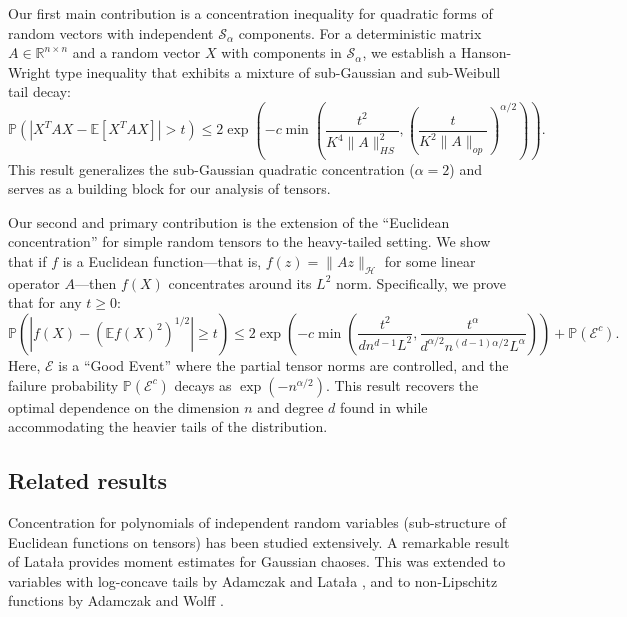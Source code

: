 \documentclass[11pt]{amsart}
\theoremstyle{definition}
\theoremstyle{remark}
\begin{document}
Our first main contribution is a concentration inequality for quadratic forms of random vectors with independent $\mathcal{S}_{\alpha}$ components. For a deterministic matrix $A \in \mathbb{R}^{n \times n}$ and a random vector $X$ with components in $\mathcal{S}_{\alpha}$, we establish a Hanson-Wright type inequality \cite{RudelsonVershynin2013} that exhibits a mixture of sub-Gaussian and sub-Weibull tail decay:
\begin{equation}
    \mathbb{P}(|X^T A X - \mathbb{E}[X^T A X]| > t) \le 2 \exp\left(-c \min\left(\frac{t^2}{K^4 \|A\|_{HS}^2}, \left(\frac{t}{K^2 \|A\|_{op}}\right)^{\alpha/2}\right)\right).
    \label{eq:hanson-wright}
\end{equation}
This result generalizes the sub-Gaussian quadratic concentration ($\alpha=2$) and serves as a building block for our analysis of tensors.

Our second and primary contribution is the extension of the ``Euclidean concentration'' for simple random tensors to the heavy-tailed setting. We show that if $f$ is a Euclidean function—that is, $f(z) = \|Az\|_{\mathcal{H}}$ for some linear operator $A$—then $f(X)$ concentrates around its $L^2$ norm. Specifically, we prove that for any $t \ge 0$:
\begin{equation}
    \mathbb{P}(|f(X) - (\mathbb{E}f(X)^2)^{1/2}| \ge t) \le 2 \exp\left(-c \min\left(\frac{t^2}{d n^{d-1} L^2}, \frac{t^\alpha}{d^{\alpha/2} n^{(d-1)\alpha/2} L^\alpha}\right)\right) + \mathbb{P}(\mathcal{E}^c).
    \label{eq:euclidean-conc}
\end{equation}
Here, $\mathcal{E}$ is a ``Good Event'' where the partial tensor norms are controlled, and the failure probability $\mathbb{P}(\mathcal{E}^c)$ decays as $\exp(-n^{\alpha/2})$. This result recovers the optimal dependence on the dimension $n$ and degree $d$ found in \cite{Vershynin2020} while accommodating the heavier tails of the distribution.

\subsection{Related results}
Concentration for polynomials of independent random variables (sub-structure of Euclidean functions on tensors) has been studied extensively. A remarkable result of Lata{\l}a \cite{Latala2006} provides moment estimates for Gaussian chaoses. This was extended to variables with log-concave tails by Adamczak and Lata{\l}a \cite{Adamczak2012}, and to non-Lipschitz functions by Adamczak and Wolff \cite{Adamczak2015b}.
\end{document}
